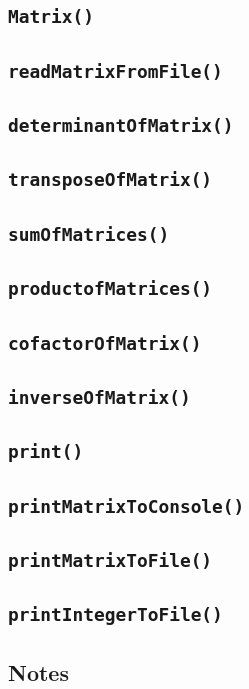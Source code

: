 \documentclass[12pt]{article}
\begin{document}
\subsection{\texttt{Matrix()}}
\subsection{\texttt{readMatrixFromFile()}}
\subsection{\texttt{determinantOfMatrix()}}
\subsection{\texttt{transposeOfMatrix()}}
\subsection{\texttt{sumOfMatrices()}}
\subsection{\texttt{productofMatrices()}}
\subsection{\texttt{cofactorOfMatrix()}}
\subsection{\texttt{inverseOfMatrix()}}
\subsection{\texttt{print()}}
\subsection{\texttt{printMatrixToConsole()}}
\subsection{\texttt{printMatrixToFile()}}
\subsection{\texttt{printIntegerToFile()}}



\newpage %



\begin{center}
\section{Notes}
\end{center}
\end{document}
